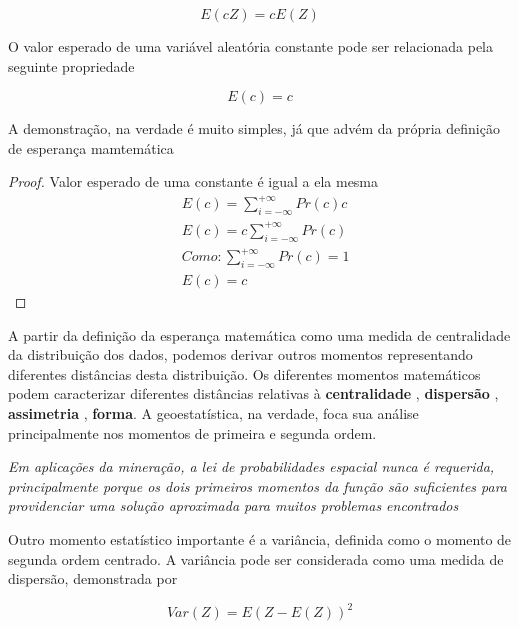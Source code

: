 \begin{equation}\label{eq3:Propesperancamatematica}
E\left(cZ\right)= cE\left(Z\right)
\end{equation}

O valor esperado de uma variável aleatória constante pode ser relacionada pela seguinte propriedade

\begin{equation}\label{eq4:Propesperancamatematica2}
 E(c) = c
\end{equation}

A demonstração, na verdade é muito simples, já que advém da própria definição de esperança mamtemática


\begin{proof} 
	Valor esperado de uma constante é igual a ela mesma
	\begin{align*}
	&E\left(c\right)= \sum_{i=-\infty}^{+\infty}Pr\left(c\right)c \\
	& E\left(c\right)= c\sum_{i=-\infty}^{+\infty}Pr\left(c\right) \\
	& Como: \sum_{i=-\infty}^{+\infty}Pr\left(c\right) = 1 \\
	& E\left(c\right)= c
	\end{align*}
\end{proof}

A partir da definição da esperança matemática como uma medida de centralidade da distribuição dos dados, podemos derivar outros momentos representando diferentes distâncias desta distribuição. Os diferentes momentos matemáticos podem caracterizar diferentes distâncias relativas à \textbf{centralidade} , \textbf{dispersão} , \textbf{assimetria} , \textbf{forma}. A geoestatística, na verdade, foca sua análise principalmente nos momentos de primeira e segunda ordem.

\begin{remark}
	\textit{Em aplicações da mineração, a lei de probabilidades espacial nunca é requerida, principalmente porque os dois primeiros momentos da função são suficientes para providenciar uma solução aproximada para muitos problemas encontrados} \citet{journel1978mining}
\end{remark}

Outro momento estatístico importante é a variância, definida como o momento de segunda ordem centrado. A variância pode ser considerada como uma medida de dispersão, demonstrada por

\begin{equation}\label{eq4:CapVariancia1}
Var\left(Z\right)= E\left( Z - E\left( Z\right) \right)^2
\end{equation} 


